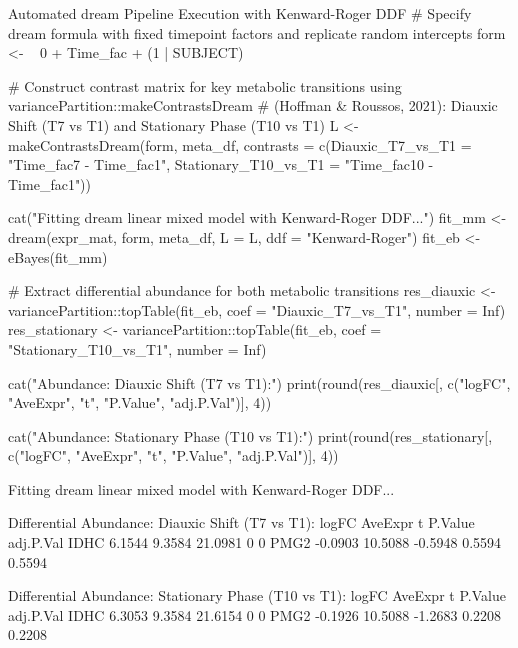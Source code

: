 \documentclass[11pt,twoside,openright]{book}
\begin{document}
\begin{rchunk}{Automated dream Pipeline Execution with Kenward-Roger DDF}
# Specify dream formula with fixed timepoint factors and replicate random intercepts
form <- ~ 0 + Time_fac + (1 | SUBJECT)

# Construct contrast matrix for key metabolic transitions using variancePartition::makeContrastsDream
# (Hoffman & Roussos, 2021): Diauxic Shift (T7 vs T1) and Stationary Phase (T10 vs T1)
L <- makeContrastsDream(form, meta_df, 
                        contrasts = c(Diauxic_T7_vs_T1     = "Time_fac7 - Time_fac1",
                                      Stationary_T10_vs_T1 = "Time_fac10 - Time_fac1"))

cat("Fitting dream linear mixed model with Kenward-Roger DDF...\n")
fit_mm <- dream(expr_mat, form, meta_df, L = L, ddf = "Kenward-Roger")
fit_eb <- eBayes(fit_mm)

# Extract differential abundance for both metabolic transitions
res_diauxic   <- variancePartition::topTable(fit_eb, coef = "Diauxic_T7_vs_T1", number = Inf)
res_stationary <- variancePartition::topTable(fit_eb, coef = "Stationary_T10_vs_T1", number = Inf)

cat("\nDifferential Abundance: Diauxic Shift (T7 vs T1):\n")
print(round(res_diauxic[, c("logFC", "AveExpr", "t", "P.Value", "adj.P.Val")], 4))

cat("\nDifferential Abundance: Stationary Phase (T10 vs T1):\n")
print(round(res_stationary[, c("logFC", "AveExpr", "t", "P.Value", "adj.P.Val")], 4))
\end{rchunk}

\begin{routput}
Fitting dream linear mixed model with Kenward-Roger DDF...

Differential Abundance: Diauxic Shift (T7 vs T1):
       logFC AveExpr       t P.Value adj.P.Val
IDHC  6.1544  9.3584 21.0981       0         0
PMG2 -0.0903 10.5088 -0.5948  0.5594    0.5594

Differential Abundance: Stationary Phase (T10 vs T1):
       logFC AveExpr       t P.Value adj.P.Val
IDHC  6.3053  9.3584 21.6154       0         0
PMG2 -0.1926 10.5088 -1.2683  0.2208    0.2208
\end{routput}
\end{document}
